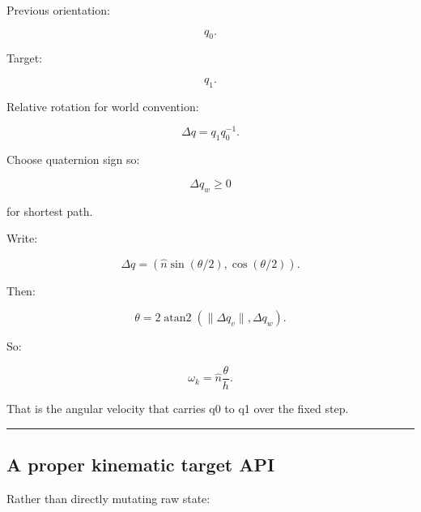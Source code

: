 Previous orientation:

\[
q_0.
\]

Target:

\[
q_1.
\]

Relative rotation for world convention:

\[
\Delta q
=
q_1q_0^{-1}.
\]

Choose quaternion sign so:

\[
\Delta q_w\ge0
\]

for shortest path.

Write:

\[
\Delta q
=
(
\hat n\sin(\theta/2),
\cos(\theta/2)
).
\]

Then:

\[
\theta
=
2\operatorname{atan2}
(
\|\Delta q_v\|,
\Delta q_w
).
\]

So:

\[
\boxed{
\omega_k
=
\hat n
\frac{\theta}{h}.
}
\]

That is the angular velocity that carries q0 to q1 over the fixed step.

\begin{center}\rule{0.5\linewidth}{0.5pt}\end{center}

\subsection{A proper kinematic target API}\label{06-engine-ii-ch037-a-proper-kinematic-target-api}

Rather than directly mutating raw state:

